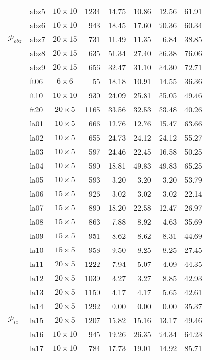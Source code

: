 \begin{longtable}{|ll|c|r|rrrr|}
\multirow{5}{*}{$\mathcal{P}_{abz}$}
& abz5&$10\times10$& 1234 & 14.75 & 10.86 & 12.56 & 61.91\\
& abz6&$10\times10$& 943 & 18.45 & 17.60 & 20.36 & 60.34\\
& abz7&$20\times15$& 731 & 11.49 & 11.35 & 6.84 & 38.85\\
& abz8&$20\times15$& 635 & 51.34 & 27.40 & 36.38 & 76.06\\
& abz9&$20\times15$& 656 & 32.47 & 31.10 & 34.30 & 72.71\\
\hline\pagebreak[2]
\multirow{3}{*}{$\mathcal{P}_{ft}$}
& ft06&$6\times6$& 55 & 18.18 & 10.91 & 14.55 & 36.36\\
& ft10&$10\times10$& 930 & 24.09 & 25.81 & 35.05 & 49.46\\
& ft20&$20\times5$& 1165 & 33.56 & 32.53 & 33.48 & 40.26\\
\hline\pagebreak[2]
\multirow{12}{*}{$\mathcal{P}_{la}$}
& la01&$10\times5$& 666 & 12.76 & 12.76 & 15.47 & 63.66\\
& la02&$10\times5$& 655 & 24.73 & 24.12 & 24.12 & 55.27\\
& la03&$10\times5$& 597 & 24.46 & 22.45 & 16.58 & 50.25\\
& la04&$10\times5$& 590 & 18.81 & 49.83 & 49.83 & 65.25\\
& la05&$10\times5$& 593 & 3.20 & 3.20 & 3.20 & 53.79\\
& la06&$15\times5$& 926 & 3.02 & 3.02 & 3.02 & 22.14\\
& la07&$15\times5$& 890 & 18.20 & 22.58 & 12.47 & 26.97\\
& la08&$15\times5$& 863 & 7.88 & 8.92 & 4.63 & 35.69\\
& la09&$15\times5$& 951 & 8.62 & 8.62 & 8.31 & 44.69\\
& la10&$15\times5$& 958 & 9.50 & 8.25 & 8.25 & 27.45\\
& la11&$20\times5$& 1222 & 7.94 & 5.07 & 4.09 & 44.35\\
& la12&$20\times5$& 1039 & 3.27 & 3.27 & 8.85 & 42.93\\
\multirow{28}{*}{$\mathcal{P}_{la}$} & la13&$20\times5$& 1150 & 4.17 & 4.17 & 5.65 & 42.61\\
& la14&$20\times5$& 1292 & 0.00 & 0.00 & 0.00 & 35.37\\
& la15&$20\times5$& 1207 & 15.82 & 15.16 & 13.17 & 49.46\\
& la16&$10\times10$& 945 & 19.26 & 26.35 & 24.34 & 64.23\\
& la17&$10\times10$& 784 & 17.73 & 19.01 & 14.92 & 85.71\\

\end{longtable}

